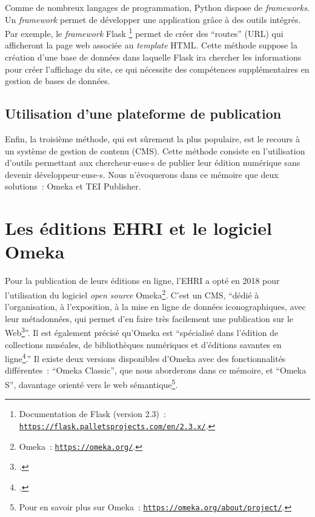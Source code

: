 Comme de nombreux langages de programmation, Python dispose de \textit{frameworks}. Un \textit{framework} permet de développer une application grâce à des outils intégrés. Par exemple, le \textit{framework} Flask \footnote{Documentation de Flask (version 2.3)~: \texttt{\href{https://flask.palletsproject.com/en/2.3.x/}{https://flask.palletsprojects.com/en/2.3.x/}}.} permet de créer des \enquote{routes} (URL) qui afficheront la page web associée au \textit{template} HTML. Cette méthode suppose la création d'une base de données dans laquelle Flask ira chercher les informations pour créer l'affichage du site, ce qui nécessite des compétences supplémentaires en gestion de bases de données.


\subsection{Utilisation d'une plateforme de publication}
Enfin, la troisième méthode, qui est sûrement la plus populaire, est le recours à un système de gestion de contenu (CMS). Cette méthode consiste en l'utilisation d'outils permettant aux chercheur$\cdot$euse$\cdot$s de publier leur édition numérique sans devenir développeur$\cdot$euse$\cdot$s. Nous n'évoquerons dans ce mémoire que deux solutions~: Omeka et TEI Publisher.   



\section{Les éditions EHRI et le logiciel Omeka}
Pour la publication de leurs éditions en ligne, l'EHRI a opté en 2018 pour l'utilisation du logiciel \textit{open source} Omeka\footnote{Omeka~: \texttt{\href{https://omeka.org/}{https://omeka.org/}}.}. C'est un CMS, \enquote{dédié à l'organisation, à l'exposition, à la mise en ligne de données iconographiques, avec leur métadonnées, qui permet d'en faire très facilement une publication sur le Web\footcite[p.~81]{BoulaireCarabelli2017}}. Il est également précisé qu'Omeka est \enquote{spécialisé dans l'édition de collections muséales, de bibliothèques numériques et d'éditions savantes en ligne\footcite[p.~115]{IdmhandRiffardWalter2017}.} Il existe deux versions disponibles d'Omeka avec des fonctionnalités différentes~: \enquote{Omeka Classic}, que nous aborderons dans ce mémoire, et \enquote{Omeka S}, davantage orienté vers le web sémantique\footnote{Pour en savoir plus sur Omeka~: \texttt{\href{https://omeka.org/about/project/}{https://omeka.org/about/project/}}.}.

